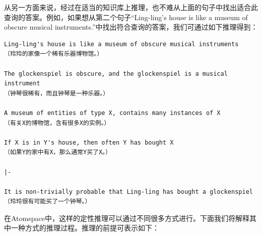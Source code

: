 从另一方面来说，经过在适当的知识库上推理，也不难从上面的句子中找出适合此查询的答案。例如，如果想从第二个句子“Ling-ling's house is like a museum of obscure musical instruments.”中找出符合查询的答案，我们可通过如下推理得到：

\begin{verbatim}
Ling-ling's house is like a museum of obscure musical instruments
（玲玲的家像一个稀有乐器博物馆。）

The glockenspiel is obscure, and the glockenspiel is a musical instrument
（钟琴很稀有，而且钟琴是一种乐器。）

A museum of entities of type X, contains many instances of X
（有关X的博物馆，含有很多X的实例。）

If X is in Y's house, then often Y has bought X
（如果Y的家中有X，那么通常Y买了X。）

|-

It is non-trivially probable that Ling-ling has bought a glockenspiel
（玲玲很有可能买了一个钟琴。）
\end{verbatim}

在Atomspace中，这样的定性推理可以通过不同很多方式进行。下面我们将解释其中一种方式的推理过程。推理的前提可表示如下：


